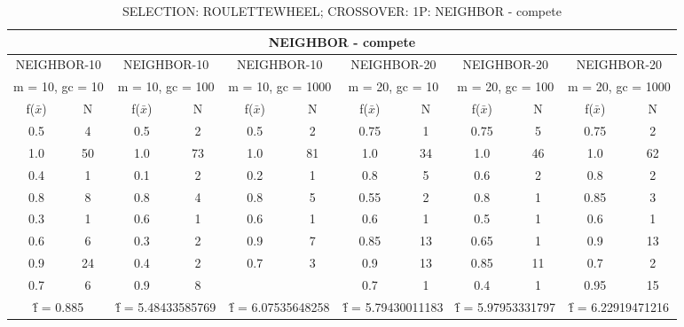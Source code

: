 \begin{table}[H]
	\centering
	\caption{SELECTION: ROULETTEWHEEL; CROSSOVER: 1P: NEIGHBOR - compete}
	\begin{adjustbox}{width=1\textwidth}
		\begin{tabular}{ |c|c||c|c||c|c||c|c||c|c||c|c| }
			\hline
			\multicolumn{12}{|c|}{NEIGHBOR - compete} \\
			\hline
			\multicolumn{2}{|c||}{NEIGHBOR-10} & \multicolumn{2}{c||}{NEIGHBOR-10} & \multicolumn{2}{c||}{NEIGHBOR-10} & \multicolumn{2}{c||}{NEIGHBOR-20} & \multicolumn{2}{c||}{NEIGHBOR-20} & \multicolumn{2}{c|}{NEIGHBOR-20}\\
			\hline
			\multicolumn{2}{|c||}{m = 10, gc = 10} & \multicolumn{2}{c||}{m = 10, gc = 100} & \multicolumn{2}{c||}{m = 10, gc = 1000} & \multicolumn{2}{c||}{m = 20, gc = 10} & \multicolumn{2}{c||}{m = 20, gc = 100} & \multicolumn{2}{c|}{m = 20, gc = 1000}\\
			\hline
			f($\bar{x}$) & N & f($\bar{x}$) & N & f($\bar{x}$) & N & f($\bar{x}$) & N & f($\bar{x}$) & N & f($\bar{x}$) & N\\
			\hline
			\hline
			0.5 & 4 & 0.5 & 2 & 0.5 & 2 & 0.75 & 1 & 0.75 & 5 & 0.75 & 2\\
			1.0 & 50 & 1.0 & 73 & 1.0 & 81 & 1.0 & 34 & 1.0 & 46 & 1.0 & 62\\
			0.4 & 1 & 0.1 & 2 & 0.2 & 1 & 0.8 & 5 & 0.6 & 2 & 0.8 & 2\\
			0.8 & 8 & 0.8 & 4 & 0.8 & 5 & 0.55 & 2 & 0.8 & 1 & 0.85 & 3\\
			0.3 & 1 & 0.6 & 1 & 0.6 & 1 & 0.6 & 1 & 0.5 & 1 & 0.6 & 1\\
			0.6 & 6 & 0.3 & 2 & 0.9 & 7 & 0.85 & 13 & 0.65 & 1 & 0.9 & 13\\
			0.9 & 24 & 0.4 & 2 & 0.7 & 3 & 0.9 & 13 & 0.85 & 11 & 0.7 & 2\\
			0.7 & 6 & 0.9 & 8 &   &   & 0.7 & 1 & 0.4 & 1 & 0.95 & 15\\
			\hline
			\multicolumn{2}{|c||}{\^{f} = 0.885} & \multicolumn{2}{c||}{\^{f} = 5.48433585769} & \multicolumn{2}{c||}{\^{f} = 6.07535648258} & \multicolumn{2}{c||}{\^{f} = 5.79430011183} & \multicolumn{2}{c||}{\^{f} = 5.97953331797} & \multicolumn{2}{c|}{\^{f} = 6.22919471216}\\
			\hline
		\end{tabular}
	\end{adjustbox}
\end{table}
